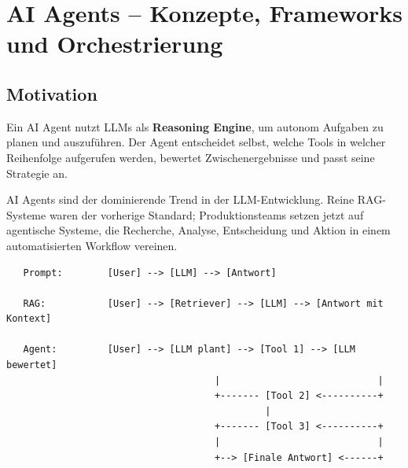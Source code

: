 \chapter{AI Agents -- Konzepte, Frameworks und Orchestrierung}
\label{chap:ai_agenten}


\section{Motivation}


Ein AI Agent nutzt LLMs als \textbf{Reasoning Engine}, um autonom Aufgaben zu planen und auszuführen. Der Agent entscheidet selbst, welche Tools in welcher Reihenfolge aufgerufen werden, bewertet Zwischenergebnisse und passt seine Strategie an.

AI Agents sind der dominierende Trend in der LLM-Entwicklung. Reine RAG-Systeme waren der vorherige Standard; Produktionsteams setzen jetzt auf agentische Systeme, die Recherche, Analyse, Entscheidung und Aktion in einem automatisierten Workflow vereinen.

\begin{verbatim}
   Prompt:        [User] --> [LLM] --> [Antwort]

   RAG:           [User] --> [Retriever] --> [LLM] --> [Antwort mit Kontext]

   Agent:         [User] --> [LLM plant] --> [Tool 1] --> [LLM bewertet]
                                     |                            |
                                     +------- [Tool 2] <----------+
                                              |
                                     +------- [Tool 3] <----------+
                                     |                            |
                                     +--> [Finale Antwort] <------+
\end{verbatim}

